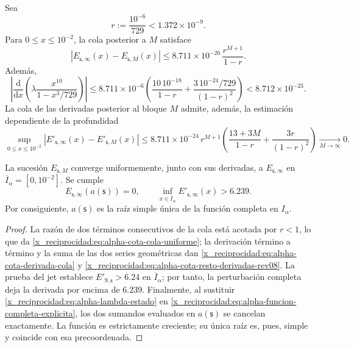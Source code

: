 Sea
\[
 r:=\frac{10^{-6}}{729}<1.372\mathbin{\times}10^{-9}.
\]
Para \(0\leq x\leq10^{-2}\), la cola posterior a \(M\) satisface
\begin{equation}
 \left|E_{\mathsf s,\infty}(x)-E_{\mathsf s,M}(x)\right|
 \leq
 8.711\mathbin{\times}10^{-26}\,\frac{r^{M+1}}{1-r}.
 \label{x_reciprocidad:eq:alpha-cota-cola-uniforme}
\end{equation}
Además,
\begin{equation}
 \left|\frac{\mathrm d}{\mathrm dx}
  \left(\lambda\frac{x^{10}}{1-x^3/729}\right)\right|
 \leq 8.711\mathbin{\times}10^{-6}
 \left(\frac{10\,10^{-18}}{1-r}
 +\frac{3\,10^{-24}/729}{(1-r)^2}\right)
 <8.712\mathbin{\times}10^{-23}.
 \label{x_reciprocidad:eq:alpha-cota-derivada-cola}
\end{equation}
La cola de las derivadas posterior al bloque \(M\) admite, además, la
estimación dependiente de la profundidad
\begin{equation}
 \sup_{0\le x\le10^{-2}}
 \left|E'_{\mathsf s,\infty}(x)-E'_{\mathsf s,M}(x)\right|
 \le 8.711\mathbin{\times}10^{-24}\,r^{M+1}
 \left(\frac{13+3M}{1-r}+\frac{3r}{(1-r)^2}\right)
 \xrightarrow[M\to\infty]{}0.
 \label{x_reciprocidad:eq:alpha-cota-resto-derivadas-rev08}
\end{equation}

\begin{theorem}
\label{x_reciprocidad:thm:alpha-raiz-completa-explicita}
La sucesión \(E_{\mathsf s,M}\) converge uniformemente, junto con sus
derivadas, a \(E_{\mathsf s,\infty}\) en
\(\overline I_\alpha=[0,10^{-2}]\). Se cumple
\begin{equation}
 E_{\mathsf s,\infty}(a(\mathsf s))=0,
 \qquad
 \inf_{x\in\overline I_\alpha}
 E'_{\mathsf s,\infty}(x)>6.239.
 \label{x_reciprocidad:eq:alpha-raiz-y-derivada-completas}
\end{equation}
Por consiguiente, \(a(\mathsf s)\) es la raíz simple única de la función
completa en \(I_\alpha\).
\end{theorem}

\begin{proof}
La razón de dos términos consecutivos de la cola está acotada por \(r<1\),
lo que da \eqref{x_reciprocidad:eq:alpha-cota-cola-uniforme}; la derivación término a
término y la suma de las dos series geométricas dan
\eqref{x_reciprocidad:eq:alpha-cota-derivada-cola} y
\eqref{x_reciprocidad:eq:alpha-cota-resto-derivadas-rev08}. La prueba del jet establece
\(E'_{9,\mathsf s}>6.24\) en \(\overline I_\alpha\); por tanto, la
perturbación completa deja la derivada por encima de \(6.239\).
Finalmente, al sustituir \eqref{x_reciprocidad:eq:alpha-lambda-estado} en
\eqref{x_reciprocidad:eq:alpha-funcion-completa-explicita}, los dos sumandos evaluados en
\(a(\mathsf s)\) se cancelan exactamente. La función es estrictamente
creciente; su única raíz es, pues, simple y coincide con esa precoordenada.
\end{proof}

